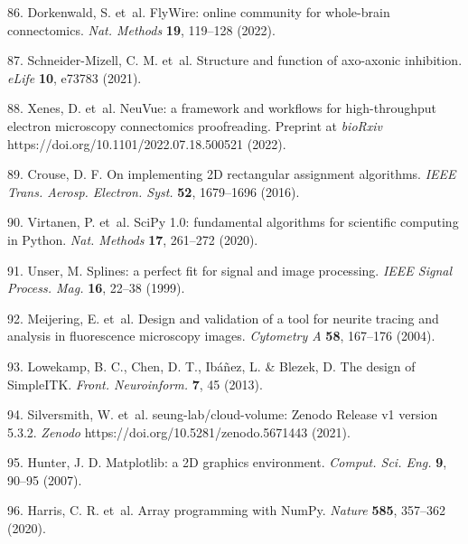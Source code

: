 \documentclass{article}
\begin{document}
\begin{hangpars}
86. Dorkenwald, S. et~al. FlyWire: online community for whole-brain connectomics. \emph{Nat. Methods} \textbf{19}, 119–128 (2022). 

87. Schneider-Mizell, C. M. et~al. Structure and function of axo-axonic inhibition. \emph{eLife} \textbf{10}, e73783 (2021). 

88. Xenes, D. et~al. NeuVue: a framework and workflows for high-throughput electron microscopy connectomics proofreading. Preprint at \emph{bioRxiv} https://doi.org/10.1101/2022.07.18.500521 (2022). 

89. Crouse, D. F. On implementing 2D rectangular assignment algorithms. \emph{IEEE Trans. Aerosp. Electron. Syst.} \textbf{52}, 1679–1696 (2016). 

90. Virtanen, P. et~al. SciPy 1.0: fundamental algorithms for scientific computing in Python. \emph{Nat. Methods} \textbf{17}, 261–272 (2020). 

91. Unser, M. Splines: a perfect fit for signal and image processing. \emph{IEEE Signal Process. Mag.} \textbf{16}, 22–38 (1999). 

92. Meijering, E. et~al. Design and validation of a tool for neurite tracing and analysis in fluorescence microscopy images. \emph{Cytometry A} \textbf{58}, 167–176 (2004). 

93. Lowekamp, B. C., Chen, D. T., Ibáñez, L. \& Blezek, D. The design of SimpleITK. \emph{Front. Neuroinform.} \textbf{7}, 45 (2013). 

94. Silversmith, W. et~al. seung-lab/cloud-volume: Zenodo Release v1 version 5.3.2. \emph{Zenodo} https://doi.org/10.5281/zenodo.5671443 (2021). 

95. Hunter, J. D. Matplotlib: a 2D graphics environment. \emph{Comput. Sci. Eng.} \textbf{9}, 90–95 (2007). 

96. Harris, C. R. et~al. Array programming with NumPy. \emph{Nature} \textbf{585}, 357–362 (2020).
\end{hangpars}
\end{document}
